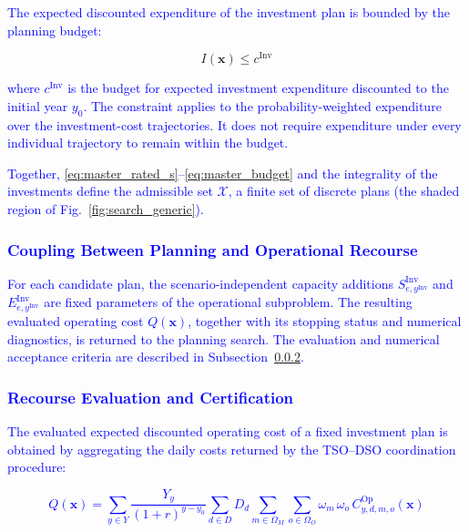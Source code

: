 \documentclass[preprint,12pt]{elsarticle}
\begin{document}
\textcolor{blue}{
    The expected discounted expenditure of the investment plan is bounded by the planning budget:
}

\begin{equation}
    I(\boldsymbol{x}) \leq c^{\text{Inv}}
    \label{eq:master_budget}
\end{equation}

\noindent
\textcolor{blue}{
    where 
    $c^{\text{Inv}}$ is the budget for expected investment expenditure discounted to the initial year $y_0$.
    The constraint applies to the probability-weighted expenditure over the investment-cost trajectories. It does not require expenditure under every individual trajectory to remain within the budget.
}

\textcolor{blue}{
    Together, \eqref{eq:master_rated_s}--\eqref{eq:master_budget} and the integrality of the investments define the admissible set $\mathcal{X}$, a finite set of discrete plans (the shaded region of Fig.~\ref{fig:search_generic}). 
}

\subsubsection{\textcolor{blue}{Coupling Between Planning and Operational Recourse}}

\textcolor{blue}{
    For each candidate plan, the scenario-independent capacity additions $S^{\text{Inv}}_{e,y^{\text{Inv}}}$ and $E^{\text{Inv}}_{e,y^{\text{Inv}}}$ are fixed parameters of the operational subproblem. The resulting evaluated operating cost $Q(\boldsymbol{x})$, together with its stopping status and numerical diagnostics, is returned to the planning search. The evaluation and numerical acceptance criteria are described in Subsection~\ref{subsubsec:certification}.
}

\subsubsection{\textcolor{blue}{Recourse Evaluation and Certification}}
\label{subsubsec:certification}

\textcolor{blue}{
    The evaluated expected discounted operating cost of a fixed investment plan is obtained by aggregating the daily costs returned by the TSO--DSO coordination procedure:
}

\textcolor{blue}{
    \begin{equation}
        Q(\boldsymbol{x}) =
        \sum_{y \in Y} \frac{Y_y}{(1+r)^{y-y_0}}
        \sum_{d \in D} D_d
        \sum_{m \in \Omega_M} \sum_{o \in \Omega_O} \omega_m \, \omega_o \,
        C^{\text{Op}}_{y,d,m,o}(\boldsymbol{x})
        \label{eq:recourse_value}
    \end{equation}
}
\end{document}
